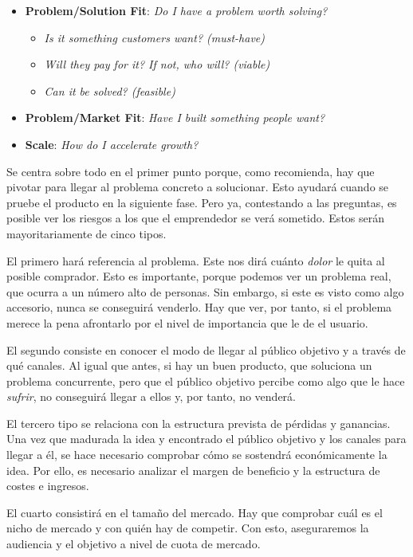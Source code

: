 \begin{itemize}
    \item \textbf{Problem/Solution Fit}: \textit{Do I have a problem worth solving?}
    \begin{itemize}
        \item \textit{Is it something customers want? (must-have)}
        \item \textit{Will they pay for it? If not, who will? (viable)}
        \item \textit{Can it be solved? (feasible)}
    \end{itemize}
    \item \textbf{Problem/Market Fit}: \textit{Have I built something people want?}
    \item \textbf{Scale}: \textit{How do I accelerate growth?}
\end{itemize}

Se centra sobre todo en el primer punto porque, como recomienda, hay que pivotar para llegar al problema concreto a solucionar. Esto ayudará cuando se pruebe el producto en la siguiente fase. Pero ya, contestando a las preguntas, es posible ver los riesgos a los que el emprendedor se verá sometido. Estos serán mayoritariamente de cinco tipos.

El primero hará referencia al problema. Este nos dirá cuánto \textit{dolor} le quita al posible comprador. Esto es importante, porque podemos ver un problema real, que ocurra a un número alto de personas. Sin embargo, si este es visto como algo accesorio, nunca se conseguirá venderlo. Hay que ver, por tanto, si el problema merece la pena afrontarlo por el nivel de importancia que le de el usuario.

El segundo consiste en conocer el modo de llegar al público objetivo y a través de qué canales. Al igual que antes, si hay un buen producto, que soluciona un problema concurrente, pero que el público objetivo percibe como algo que le hace \textit{sufrir}, no conseguirá llegar a ellos y, por tanto, no venderá.

El tercero tipo se relaciona con la estructura prevista de pérdidas y ganancias. Una vez que madurada la idea y encontrado el público objetivo y los canales para llegar a él, se hace necesario comprobar cómo se sostendrá económicamente la idea. Por ello, es necesario analizar el margen de beneficio y la estructura de costes e ingresos.

El cuarto consistirá en el tamaño del mercado. Hay que comprobar cuál es el nicho de mercado y con quién hay de competir. Con esto, aseguraremos la audiencia y el objetivo a nivel de cuota de mercado.

